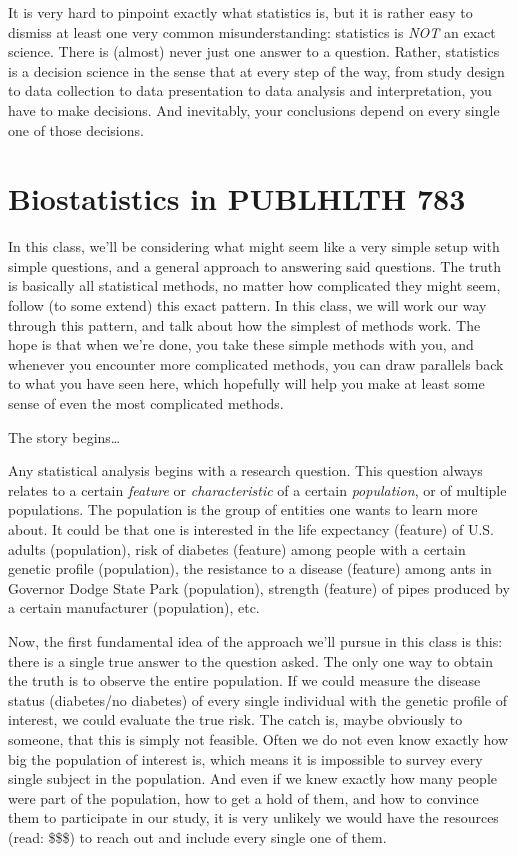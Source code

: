 \documentclass[]{book}
\theoremstyle{definition}
\theoremstyle{definition}
\theoremstyle{definition}
\theoremstyle{remark}
\begin{document}
It is very hard to pinpoint exactly what statistics is, but it is rather easy to dismiss at least one very common misunderstanding: statistics is \emph{NOT} an exact science. There is (almost) never just one answer to a question. Rather, statistics is a decision science in the sense that at every step of the way, from study design to data collection to data presentation to data analysis and interpretation, you have to make decisions. And inevitably, your conclusions depend on every single one of those decisions.

\hypertarget{biostatistics-in-publhlth-783}{%
\section{Biostatistics in PUBLHLTH 783}\label{biostatistics-in-publhlth-783}}

In this class, we'll be considering what might seem like a very simple setup with simple questions, and a general approach to answering said questions. The truth is basically all statistical methods, no matter how complicated they might seem, follow (to some extend) this exact pattern. In this class, we will work our way through this pattern, and talk about how the simplest of methods work. The hope is that when we're done, you take these simple methods with you, and whenever you encounter more complicated methods, you can draw parallels back to what you have seen here, which hopefully will help you make at least some sense of even the most complicated methods.

The story begins\ldots{}

Any statistical analysis begins with a research question. This question always relates to a certain \emph{feature} or \emph{characteristic} of a certain \emph{population}, or of multiple populations. The population is the group of entities one wants to learn more about. It could be that one is interested in the life expectancy (feature) of U.S. adults (population), risk of diabetes (feature) among people with a certain genetic profile (population), the resistance to a disease (feature) among ants in Governor Dodge State Park (population), strength (feature) of pipes produced by a certain manufacturer (population), etc.

Now, the first fundamental idea of the approach we'll pursue in this class is this: there is a single true answer to the question asked. The only one way to obtain the truth is to observe the entire population. If we could measure the disease status (diabetes/no diabetes) of every single individual with the genetic profile of interest, we could evaluate the true risk. The catch is, maybe obviously to someone, that this is simply not feasible. Often we do not even know exactly how big the population of interest is, which means it is impossible to survey every single subject in the population. And even if we knew exactly how many people were part of the population, how to get a hold of them, and how to convince them to participate in our study, it is very unlikely we would have the resources (read: \$\$\$) to reach out and include every single one of them.
\end{document}
